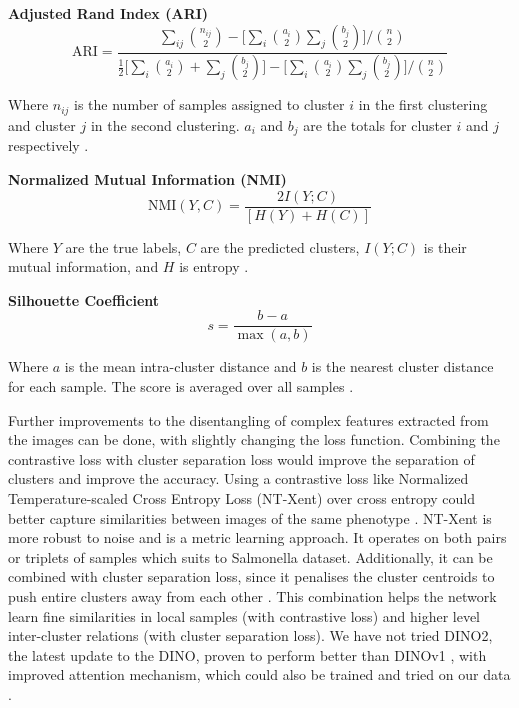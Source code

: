 \documentclass[12pt,a4paper]{article}
\begin{document}
\textbf{Adjusted Rand Index (ARI)}
\begin{equation}
\text{ARI} = \frac{\sum_{ij} \binom{n_{ij}}{2} - \biggl[ \sum_i \binom{a_i}{2}  \sum_j \binom{b_j}{2} \biggr] / \binom{n}{2}} {\frac{1}{2} \biggl[ \sum_i \binom{a_i}{2} + \sum_j \binom{b_j}{2} \biggr] - \biggl[ \sum_i \binom{a_i}{2}  \sum_j \binom{b_j}{2} \biggr] / \binom{n}{2}}
\end{equation}


Where $n_{ij}$ is the number of samples assigned to cluster $i$ in the first clustering and cluster $j$ in the second clustering. $a_i$ and $b_j$ are the totals for cluster $i$ and $j$ respectively \cite{ARI}.

\textbf{Normalized Mutual Information (NMI)}
\begin{equation}
\text{NMI}(Y, C) = \frac{2 I(Y;C)}{[H(Y) + H(C)]}
\end{equation}

Where $Y$ are the true labels, $C$ are the predicted clusters, $I(Y;C)$ is their mutual information, and $H$ is entropy \cite{NMI}.

\textbf{Silhouette Coefficient}
\begin{equation}
s = \frac{b-a}{\max(a,b)}
\end{equation}

Where $a$ is the mean intra-cluster distance and $b$ is the nearest cluster distance for each sample. The score is averaged over all samples \cite{silhouettecoefficient}.


Further improvements to the disentangling of complex features extracted from the images can be done, with slightly changing the loss function. Combining the contrastive loss with cluster separation loss would improve the separation of clusters and improve the accuracy. Using a contrastive loss like Normalized Temperature-scaled Cross Entropy Loss (NT-Xent) over cross entropy could better capture similarities between images of the same phenotype \cite{koch2015siamese}. NT-Xent is more robust to noise and is a metric learning approach. It operates on both pairs or triplets of samples which suits to Salmonella dataset. Additionally, it can be combined with cluster separation loss, since it penalises the cluster centroids to push entire clusters away from each other \cite{xu2018variational}. This combination helps the network learn fine similarities in local samples (with contrastive loss) and higher level inter-cluster relations (with cluster separation loss). We have not tried DINO2, the latest update to the DINO, proven to perform better than DINOv1 \cite{caron2021emerging}, with improved attention mechanism, which could also be trained and tried on our data \cite{chen2023dinov2}.
\end{document}
